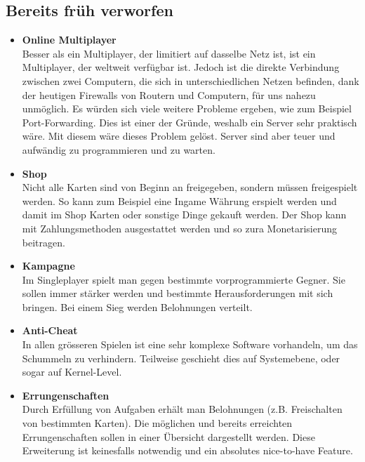 \subsection{Bereits früh verworfen}
\begin{itemize}
    \item \textbf{Online Multiplayer} \\
        Besser als ein Multiplayer, der limitiert auf dasselbe Netz ist, ist ein Multiplayer, der weltweit verfügbar ist. Jedoch ist die direkte Verbindung zwischen zwei Computern, die sich in unterschiedlichen Netzen befinden, dank der heutigen Firewalls von Routern und Computern, für uns nahezu unmöglich. 
        Es würden sich viele weitere Probleme ergeben, wie zum Beispiel Port-Forwarding. Dies ist einer der Gründe, weshalb ein Server sehr praktisch wäre. Mit diesem wäre dieses
        Problem gelöst. Server sind aber teuer und aufwändig zu programmieren und zu warten. 
    \item \textbf{Shop} \\
        Nicht alle Karten sind von Beginn an freigegeben, sondern müssen freigespielt werden.
        So kann zum Beispiel eine Ingame Währung erspielt werden und damit im Shop Karten oder sonstige Dinge gekauft werden.
        Der Shop kann mit Zahlungsmethoden ausgestattet werden und so zura Monetarisierung beitragen.
    \item \textbf{Kampagne} \\
        Im Singleplayer spielt man gegen bestimmte vorprogrammierte Gegner. Sie sollen immer stärker werden und bestimmte Herausforderungen mit sich bringen.
        Bei einem Sieg werden Belohnungen verteilt.
    \item \textbf{Anti-Cheat} \\
        In allen grösseren Spielen ist eine sehr komplexe Software vorhandeln, um das Schummeln zu verhindern.
        Teilweise geschieht dies auf Systemebene, oder sogar auf Kernel-Level.
    \item \textbf{Errungenschaften} \\
        Durch Erfüllung von Aufgaben erhält man Belohnungen (z.B. Freischalten von bestimmten Karten). 
        Die möglichen und bereits erreichten Errungenschaften sollen in einer Übersicht dargestellt werden. 
        Diese Erweiterung ist keinesfalls notwendig und ein absolutes nice-to-have Feature.
\end{itemize} 


